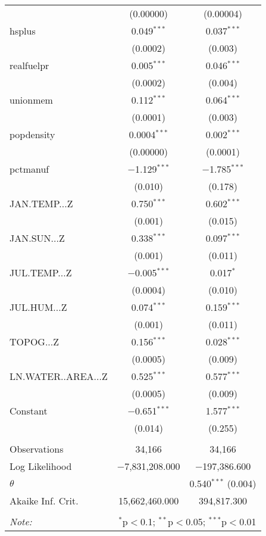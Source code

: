 \begin{table}[!htbp]
\begin{tabular}{@{\extracolsep{5pt}}lcc}
  & (0.00000) & (0.00004) \\ 
  hsplus & 0.049$^{***}$ & 0.037$^{***}$ \\ 
  & (0.0002) & (0.003) \\ 
  realfuelpr & 0.005$^{***}$ & 0.046$^{***}$ \\ 
  & (0.0002) & (0.004) \\ 
  unionmem & 0.112$^{***}$ & 0.064$^{***}$ \\ 
  & (0.0001) & (0.003) \\ 
  popdensity & 0.0004$^{***}$ & 0.002$^{***}$ \\ 
  & (0.00000) & (0.0001) \\ 
  pctmanuf & $-$1.129$^{***}$ & $-$1.785$^{***}$ \\ 
  & (0.010) & (0.178) \\ 
  JAN.TEMP...Z & 0.750$^{***}$ & 0.602$^{***}$ \\ 
  & (0.001) & (0.015) \\ 
  JAN.SUN...Z & 0.338$^{***}$ & 0.097$^{***}$ \\ 
  & (0.001) & (0.011) \\ 
  JUL.TEMP...Z & $-$0.005$^{***}$ & 0.017$^{*}$ \\ 
  & (0.0004) & (0.010) \\ 
  JUL.HUM...Z & 0.074$^{***}$ & 0.159$^{***}$ \\ 
  & (0.001) & (0.011) \\ 
  TOPOG...Z & 0.156$^{***}$ & 0.028$^{***}$ \\ 
  & (0.0005) & (0.009) \\ 
  LN.WATER..AREA...Z & 0.525$^{***}$ & 0.577$^{***}$ \\ 
  & (0.0005) & (0.009) \\ 
  Constant & $-$0.651$^{***}$ & 1.577$^{***}$ \\ 
  & (0.014) & (0.255) \\ 
 \hline \\[-1.8ex] 
Observations & 34,166 & 34,166 \\ 
Log Likelihood & $-$7,831,208.000 & $-$197,386.600 \\ 
$\theta$ &  & 0.540$^{***}$  (0.004) \\ 
Akaike Inf. Crit. & 15,662,460.000 & 394,817.300 \\ 
\hline 
\hline \\[-1.8ex] 
\textit{Note:}  & \multicolumn{2}{r}{$^{*}$p$<$0.1; $^{**}$p$<$0.05; $^{***}$p$<$0.01} \\ 
\end{tabular} 
\end{table} 
